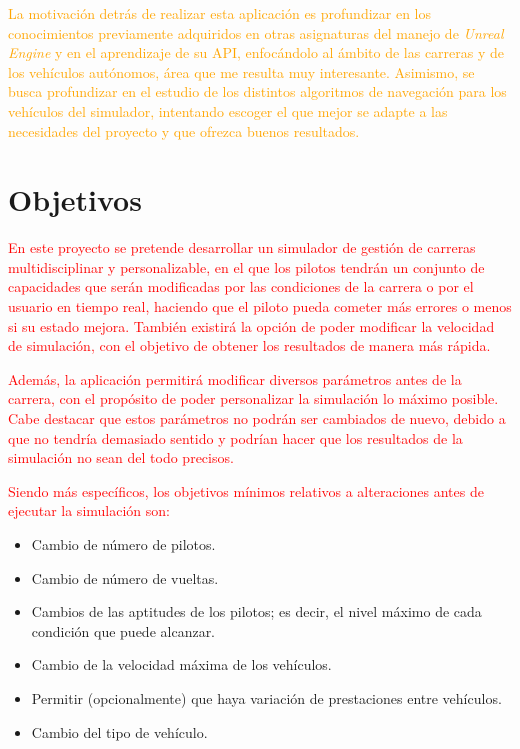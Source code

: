 \documentclass[a4paper,11pt]{book}
\begin{document}
\bigskip

\textcolor{orange}{La motivación detrás de realizar esta aplicación es profundizar en los conocimientos previamente adquiridos en otras asignaturas del manejo de \textit{Unreal Engine} y en el aprendizaje de su API, enfocándolo al ámbito de las carreras y de los vehículos autónomos, área que me resulta muy interesante. Asimismo, se busca profundizar en el estudio de los distintos algoritmos de navegación para los vehículos del simulador, intentando escoger el que mejor se adapte a las necesidades del proyecto y que ofrezca buenos resultados.}

\section{Objetivos}

\textcolor{red}{En este proyecto se pretende desarrollar un simulador de gestión de carreras multidisciplinar y personalizable, en el que los pilotos tendrán un conjunto de capacidades que serán modificadas por las condiciones de la carrera o por el usuario en tiempo real, haciendo que el piloto pueda cometer más errores o menos si su estado mejora. También existirá la opción de poder modificar la velocidad de simulación, con el objetivo de obtener los resultados de manera más rápida.}

\bigskip

\textcolor{red}{Además, la aplicación permitirá modificar diversos parámetros antes de la carrera, con el propósito de poder personalizar la simulación lo máximo posible. Cabe destacar que estos parámetros no podrán ser cambiados de nuevo, debido a que no tendría demasiado sentido y podrían hacer que los resultados de la simulación no sean del todo precisos.}


\bigskip


\textcolor{red}{Siendo más específicos, los objetivos mínimos relativos a alteraciones antes de ejecutar la simulación son:}

\begin{itemize}
   \item Cambio de número de pilotos.
   \item Cambio de número de vueltas.
   \item Cambios de las aptitudes de los pilotos; es decir, el nivel máximo de cada condición que puede alcanzar.
   \item Cambio de la velocidad máxima de los vehículos.
   \item Permitir (opcionalmente) que haya variación de prestaciones entre vehículos.
   \item Cambio del tipo de vehículo.
\end{itemize}
\end{document}
